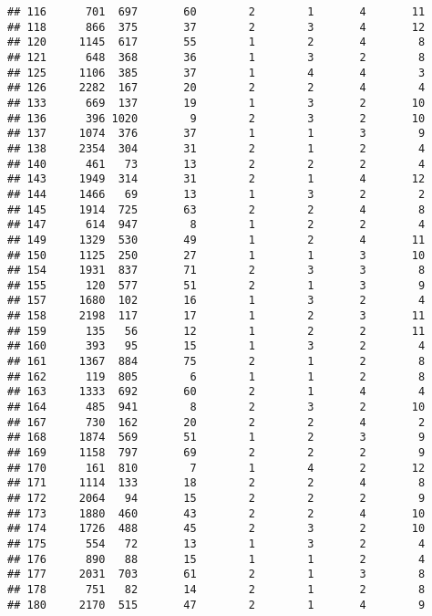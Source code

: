 \documentclass[]{article}
\begin{document}
\begin{verbatim}
## 116      701  697       60        2        1       4       11
## 118      866  375       37        2        3       4       12
## 120     1145  617       55        1        2       4        8
## 121      648  368       36        1        3       2        8
## 125     1106  385       37        1        4       4        3
## 126     2282  167       20        2        2       4        4
## 133      669  137       19        1        3       2       10
## 136      396 1020        9        2        3       2       10
## 137     1074  376       37        1        1       3        9
## 138     2354  304       31        2        1       2        4
## 140      461   73       13        2        2       2        4
## 143     1949  314       31        2        1       4       12
## 144     1466   69       13        1        3       2        2
## 145     1914  725       63        2        2       4        8
## 147      614  947        8        1        2       2        4
## 149     1329  530       49        1        2       4       11
## 150     1125  250       27        1        1       3       10
## 154     1931  837       71        2        3       3        8
## 155      120  577       51        2        1       3        9
## 157     1680  102       16        1        3       2        4
## 158     2198  117       17        1        2       3       11
## 159      135   56       12        1        2       2       11
## 160      393   95       15        1        3       2        4
## 161     1367  884       75        2        1       2        8
## 162      119  805        6        1        1       2        8
## 163     1333  692       60        2        1       4        4
## 164      485  941        8        2        3       2       10
## 167      730  162       20        2        2       4        2
## 168     1874  569       51        1        2       3        9
## 169     1158  797       69        2        2       2        9
## 170      161  810        7        1        4       2       12
## 171     1114  133       18        2        2       4        8
## 172     2064   94       15        2        2       2        9
## 173     1880  460       43        2        2       4       10
## 174     1726  488       45        2        3       2       10
## 175      554   72       13        1        3       2        4
## 176      890   88       15        1        1       2        4
## 177     2031  703       61        2        1       3        8
## 178      751   82       14        2        1       2        8
## 180     2170  515       47        2        1       4        9

\end{verbatim}
\end{document}
